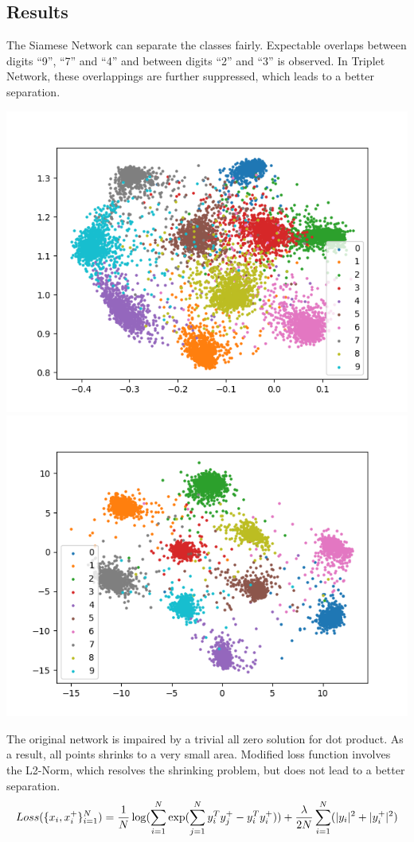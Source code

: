 \documentclass[a0,portrait]{a0poster}
\begin{document}
\begin{multicols}{2}
		\section*{Results}
		The Siamese Network can separate the classes fairly. Expectable overlaps between digits ``9'', ``7'' and ``4'' and between digits ``2'' and ``3'' is observed. In Triplet Network, these overlappings are further suppressed, which leads to a better separation.
		\begin{center}\vspace{1cm}
			\includegraphics[width=0.45\linewidth]{../report_shaoheng/siamese}
			\includegraphics[width=0.45\linewidth]{../report_shaoheng/triplet}
		\end{center}\vspace{1cm}
		
		The original network is impaired by a trivial all zero solution for dot product. As a result, all points shrinks to a very small area. Modified loss function involves the L2-Norm, which resolves the shrinking problem, but does not lead to a better separation.
		\begin{equation}
		Loss(\{x_i,x_i^+\}^N_{i=1})\notag
		=\frac{1}{N}\log(\sum_{i=1}^N\exp(\sum_{j=1}^Ny^T_iy_j^+-y_i^Ty_i^+))+ \frac{\lambda}{2N} \sum_{i=1}^N(\lvert y_i\rvert^2+ \lvert y^+_i\rvert^2)
		\end{equation}
		

\end{multicols}
\end{document}
